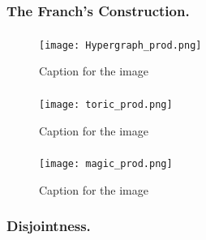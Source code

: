 \documentclass{beamer}
\begin{document}
\begin{frame}
  \frametitle{The Franch's Construction.}
\end{frame}


\begin{frame}
  \frametitle{  }


\begin{figure}[h]
    \centering
    \texttt{[image: Hypergraph\_prod.png]}
    \caption{Caption for the image}
    \label{fig:your-label}
\end{figure}

\end{frame}

\begin{frame}
  \frametitle{  }

\begin{figure}[h]
    \centering
    \texttt{[image: toric\_prod.png]}
    \caption{Caption for the image}
    \label{fig:your-label}
\end{figure}

\end{frame}
\begin{frame}
  \frametitle{ } 
\begin{figure}[h]
    \centering
    \texttt{[image: magic\_prod.png]}
    \caption{Caption for the image}
    \label{fig:your-label}
\end{figure}
\end{frame}



\begin{frame}
  \frametitle{Disjointness.}
\end{frame}
\end{document}
